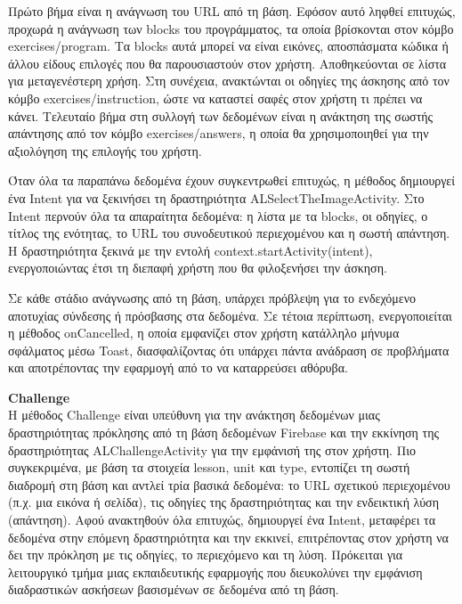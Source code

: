 \documentclass[11pt]{report}
\begin{document}
Πρώτο βήμα είναι η ανάγνωση του URL από τη βάση. Εφόσον αυτό ληφθεί επιτυχώς, προχωρά η ανάγνωση των blocks του προγράμματος, τα οποία βρίσκονται στον κόμβο exercises/program. Τα blocks αυτά μπορεί να είναι εικόνες, αποσπάσματα κώδικα ή άλλου είδους επιλογές που θα παρουσιαστούν στον χρήστη. Αποθηκεύονται σε λίστα για μεταγενέστερη χρήση. Στη συνέχεια, ανακτώνται οι οδηγίες της άσκησης από τον κόμβο exercises/instruction, ώστε να καταστεί σαφές στον χρήστη τι πρέπει να κάνει. Τελευταίο βήμα στη συλλογή των δεδομένων είναι η ανάκτηση της σωστής απάντησης από τον κόμβο exercises/answers, η οποία θα χρησιμοποιηθεί για την αξιολόγηση της επιλογής του χρήστη.  

Όταν όλα τα παραπάνω δεδομένα έχουν συγκεντρωθεί επιτυχώς, η μέθοδος δημιουργεί ένα Intent για να ξεκινήσει τη δραστηριότητα ALSelectTheImageActivity. Στο Intent περνούν όλα τα απαραίτητα δεδομένα: η λίστα με τα blocks, οι οδηγίες, ο τίτλος της ενότητας, το URL του συνοδευτικού περιεχομένου και η σωστή απάντηση. Η δραστηριότητα ξεκινά με την εντολή context.startActivity(intent), ενεργοποιώντας έτσι τη διεπαφή χρήστη που θα φιλοξενήσει την άσκηση.  

Σε κάθε στάδιο ανάγνωσης από τη βάση, υπάρχει πρόβλεψη για το ενδεχόμενο αποτυχίας σύνδεσης ή πρόσβασης στα δεδομένα. Σε τέτοια περίπτωση, ενεργοποιείται η μέθοδος onCancelled, η οποία εμφανίζει στον χρήστη κατάλληλο μήνυμα σφάλματος μέσω Toast, διασφαλίζοντας ότι υπάρχει πάντα ανάδραση σε προβλήματα και αποτρέποντας την εφαρμογή από το να καταρρεύσει αθόρυβα.  

\vspace{0.3cm}
\textbf{Challenge} \\

Η μέθοδος Challenge είναι υπεύθυνη για την ανάκτηση δεδομένων μιας δραστηριότητας πρόκλησης από τη βάση δεδομένων Firebase και την εκκίνηση της δραστηριότητας ALChallengeActivity για την εμφάνισή της στον χρήστη. Πιο συγκεκριμένα, με βάση τα στοιχεία lesson, unit και type, εντοπίζει τη σωστή διαδρομή στη βάση και αντλεί τρία βασικά δεδομένα: το URL σχετικού περιεχομένου (π.χ. μια εικόνα ή σελίδα), τις οδηγίες της δραστηριότητας και την ενδεικτική λύση (απάντηση). Αφού ανακτηθούν όλα επιτυχώς, δημιουργεί ένα Intent, μεταφέρει τα δεδομένα στην επόμενη δραστηριότητα και την εκκινεί, επιτρέποντας στον χρήστη να δει την πρόκληση με τις οδηγίες, το περιεχόμενο και τη λύση. Πρόκειται για λειτουργικό τμήμα μιας εκπαιδευτικής εφαρμογής που διευκολύνει την εμφάνιση διαδραστικών ασκήσεων βασισμένων σε δεδομένα από τη βάση.  
\end{document}

